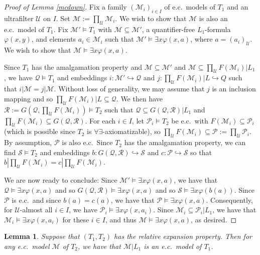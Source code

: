 \documentclass[12pt]{amsart}
\newtheorem{lem}[thm]{Lemma}
\theoremstyle{definition}
\def\cal{\mathcal}
\def\u{\mathsf 1}
\def \u{\mathcal U}
\begin{document}
\begin{proof}[Proof of Lemma \ref{mcdown}]
Fix a family $(\cal M_i)_{i\in I}$ of e.c.\ models of $T_1$ and an ultrafilter $\u$ on $I$.  Set $\cal M:=\prod_\u \cal M_i$.  We wish to show that $\cal M$ is also an e.c.\ model of $T_1$.  Fix $\cal M'\models T_1$ with $\cal M\subseteq \cal M'$, a quantifier-free $L_1$-formula $\varphi(x,y)$, and elements $a_i\in \cal M_i$ such that $\cal M'\models \exists x\varphi(x,a)$, where $a=(a_i)_\u$.  We wish to show that $\cal M\models \exists x\varphi(x,a)$.

Since $T_1$ has the amalgamation property and $\cal M\subseteq \cal M'$ and $\cal M\subseteq \prod_\u F(\cal M_i)|L_1$, we have $\cal Q\models T_1$ and embeddings $i:\cal M'\hookrightarrow \cal Q$ and $j:\prod_\u F(\cal M_i)|L\hookrightarrow Q$ such that $i|\cal M=j|\cal M$.  Without loss of generality, we may assume that $j$ is an inclusion mapping and so $\prod_\u F(\cal M_i)|L\subseteq \cal Q$.  We then have $\cal R:=G(\cal Q,\prod_\u F(\cal M_i))\models T_2$ such that $\cal Q\subseteq G(\cal Q,\cal R)|L_1$ and $\prod_\u F(\cal M_i)\subseteq G(\cal Q,\cal R)$.  For each $i\in I$, let $\cal P_i\models T_2$ be e.c.\ with $F(\cal M_i)\subseteq \cal P_i$ (which is possible since $T_2$ is $\forall\exists$-axiomatizable), so $\prod_\u F(\cal M_i)\subseteq \cal P:=\prod_\u \cal P_i$.  By assumption, $\cal P$ is also e.c.\  Since $T_2$ has the amalgamation property, we can find $\cal S\models T_2$ and embeddings $b:G(\cal Q,\cal R)\hookrightarrow \cal S$ and $c:\cal P\hookrightarrow \cal S$ so that $b|\prod_\u F(\cal M_i)=c|\prod_\u F(\cal M_i)$.

We are now ready to conclude:  Since $\cal M'\models \exists x \varphi(x,a)$, we have that $\cal Q\models \exists x \varphi(x,a)$ and so $G(\cal Q,\cal R)\models \exists x \varphi(x,a)$ and so $\cal S\models \exists x \varphi(b(a))$.  Since $\cal P$ is e.c.\ and since $b(a)=c(a)$, we have that $\cal P\models \exists x \varphi(x,a)$.  Consequently, for $\u$-almost all $i\in I$, we have $\cal P_i\models \exists x \varphi(x,a_i)$.  Since $\cal M_i\subseteq \cal P_i|L_1$, we have that $\cal M_i\models \exists x \varphi(x,a_i)$ for these $i\in I$, and thus $\cal M\models \exists x \varphi(x,a)$, as desired.
\end{proof}


\begin{lem}\label{ecrestrict}
Suppose that $(T_1,T_2)$ has the relative expansion property.  Then for any e.c.\ model $\cal M$ of $T_2$, we have that $\cal M|L_1$ is an e.c.\ model of $T_1$.
\end{lem}
\end{document}
